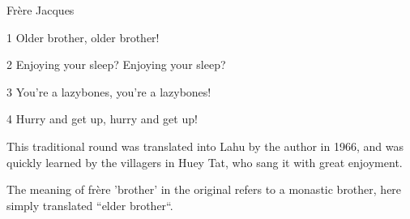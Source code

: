 
Frère Jacques

1 Older brother, older brother!

2 Enjoying your sleep? Enjoying your sleep?

3 You're a lazybones, you're a lazybones!

4 Hurry and get up, hurry and get up!

This traditional round was translated into Lahu by the author in 1966, and was
quickly learned by the villagers in Huey Tat, who sang it with great enjoyment.

The meaning of frère 'brother' in the original refers to a monastic brother, here
simply translated ``elder brother``.


